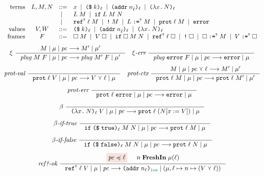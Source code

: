 \begin{figure}[tbp]
  \raggedright
  {\small \[
  \begin{array}{rcll}
    \text{terms}  & L , M , N & ::=  & x \;\mid\; \text{\texttt{{(\$}}}\;{k}\text{\texttt{{)}}}_{\ell} \;\mid\; \text{\texttt{{(addr}}}\;{n_{\hat{\ell}}}\text{\texttt{{)}}}_{\ell} \;\mid\; \text{\texttt{{(${\lambda}$}}}{x}\text{\texttt{{.}}}\,{N}\text{\texttt{{)}}}_{\ell} \\
                           &  & \;\mid\; & L \; M \;\mid\; \text{\texttt{{if}}}\;{L}\;{M}\;{N} \\
                           &  & \;\mid\; & \text{\texttt{{ref}}}^{\text{\texttt{{?}}}}\;{\ell}\;{M} \;\mid\; \text{\texttt{{!}}}\;{M} \;\mid\; {L}\;\text{\texttt{{:=}}}^{\text{\texttt{{?}}}}\;{M} \;\mid\; \text{\texttt{{prot}}}\;{\ell}\;{M} \;\mid\; \mathtt{error} \\
    \text{values}     & V, W     & ::=  & \text{\texttt{{(\$}}}\;{k}\text{\texttt{{)}}}_{\ell} \;\mid\; \text{\texttt{{(addr}}}\;{n_{\hat{\ell}}}\text{\texttt{{)}}}_{\ell} \;\mid\; \text{\texttt{{(${\lambda}$}}}{x}\text{\texttt{{.}}}\,{N}\text{\texttt{{)}}}_{\ell} \\
    \text{frames} & F & ::= & \Box\;M \;\mid\; V\;\Box \;\mid\; \text{\texttt{{if}}}\;{\Box}\;{M}\;{N} \;\mid\; \text{\texttt{{ref}}}^{\text{\texttt{{?}}}}\;{\ell}\;{\Box}
                              \;\mid\; \text{\texttt{{!}}}\;{\Box} \;\mid\; {\Box}\;\text{\texttt{{:=}}}^{\text{\texttt{{?}}}}\;{M} \;\mid\; {V}\;\text{\texttt{{:=}}}^{\text{\texttt{{?}}}}\;{\Box}
  \end{array}
  \]}
  {\small
  \begin{gather*}
  \xi~
  \inference
  {\reduce{M}{\mu}{\pc}{M'}{\mu'}}
  {\reduce{\mathit{plug}\;M\;F}{\mu}{\pc}{\mathit{plug}\;M'\;F}{\mu'}}
  \quad
  \xi\textit{-err}~
  \inference{}{\reduce{\mathit{plug}\;\key{error}\;F}{\mu}{\pc}{\key{error}}{\mu}}
  \\[1ex]
  \textit{prot-val}~
  \inference{}{\reduce{\dynprot{\ell}{V}}{\mu}{\pc}{V \curlyvee \ell}{\mu}}
  \quad
  \textit{prot-ctx}~
  \inference
  {\reduce{M}{\mu}{\pc \curlyvee \ell}{M'}{\mu'}}
  {\reduce{\dynprot{\ell}{M}}{\mu}{\pc}{\dynprot{\ell}{M'}}{\mu'}}
  \\[1ex]
  \textit{prot-err}~
  \inference{}{\reduce{\dynprot{\ell}{\key{error}}}{\mu}{\pc}{\key{error}}{\mu}}
  \\[1ex]
  \beta~
  \inference{}{\reduce{\dynlam{x}{N}{\ell} \; V}{\mu}{\pc}{\dynprot{\ell}{(N [x := V])}}{\mu}}
  \\[1ex]
  \beta\textit{-if-true}~
  \inference{}{\reduce{\dynif{\dynconst{\true}{\ell}}{M}{N}}{\mu}{\pc}{\dynprot{\ell}{M}}{\mu}}
  \\[1ex]
  \beta\textit{-if-false}~
  \inference{}{\reduce{\dynif{\dynconst{\false}{\ell}}{M}{N}}{\mu}{\pc}{\dynprot{\ell}{N}}{\mu}}
  \\[1ex]
  \textit{ref?-ok}~
  \inference
  {\highlightred{\pc \preccurlyeq \ell} & n \; \mathbf{FreshIn} \; \mu(\ell)}
  {\reduce{\dynref{?}{\ell}{V}}{\mu}{\pc}{\dynaddr{n_{\ell}}{\low}}{(\mu, \ell \mapsto n \mapsto (V \curlyvee \ell))}}

\end{gather*}}
\end{figure}
